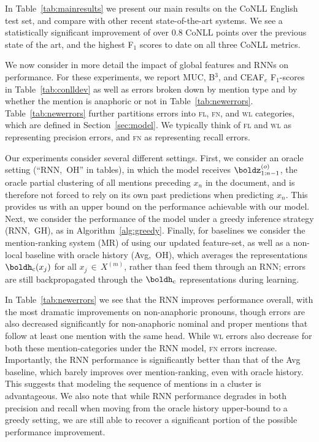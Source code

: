 \documentclass[11pt,letterpaper]{article}
\newcommand{\nicein}{\ensuremath{\,{\in}\,}}
\newcommand{\uc}{\ensuremath{\mathrm{c}}}
\newcommand{\hc}{\boldh_{\uc}}
\begin{document}
In Table~\ref{tab:mainresults} we present our main results on the CoNLL English test set, and compare with other recent state-of-the-art systems. We see a statistically significant improvement of over 0.8 CoNLL points over the previous state of the art, and the highest F$_1$ scores to date on all three CoNLL metrics. 

We now consider in more detail the impact of global features and RNNs on performance. For these experiments, we report MUC, B$^3$, and CEAF$_e$ F$_1$-scores in Table~\ref{tab:conlldev} as well as errors broken down by mention type and by whether the mention is anaphoric or not in Table~\ref{tab:newerrors}. Table~\ref{tab:newerrors} further partitions errors into \textsc{fl}, \textsc{fn}, and \textsc{wl} categories, which are defined in Section~\ref{sec:model}. We typically think of \textsc{fl} and \textsc{wl} as representing precision errors, and \textsc{fn} as representing recall errors.
 
Our experiments consider several different settings. First, we consider an oracle setting (``RNN,~OH'' in tables), in which the model receives $\boldz_{1:n-1}^{(o)}$, the oracle partial clustering of all mentions preceding $x_n$ in
the document, and is therefore not forced to rely on its own past predictions when predicting $x_n$. 
This provides us with an upper bound on the performance achievable with our model. Next, we consider the performance of the model under a greedy inference strategy (RNN,~GH), as in
Algorithm~\ref{alg:greedy}. 
Finally, for baselines we consider the mention-ranking system (MR) of  using our updated feature-set, as well as a non-local baseline with oracle history (Avg,~OH), which averages the representations $\hc(x_j)$ for all $x_j \nicein X^{(m)}$, rather than feed them through an RNN; errors are still backpropagated through the $\hc$ representations during learning.

In Table~\ref{tab:newerrors} we see that the RNN improves performance overall, with the most dramatic improvements on non-anaphoric pronouns, though errors are also decreased significantly for non-anaphoric nominal and proper mentions that follow at least one mention with the same head.
While \textsc{wl} errors also decrease for both these mention-categories under the RNN model, \textsc{fn} errors increase. Importantly, the RNN performance is significantly better than that of the Avg baseline, which barely improves over mention-ranking, even with oracle history. This suggests that modeling the sequence of mentions in a cluster is advantageous. We also note that while RNN performance degrades in both precision and recall when moving from the oracle history upper-bound to a greedy setting, we are still able to recover a significant portion of the possible performance improvement. 
\end{document}
